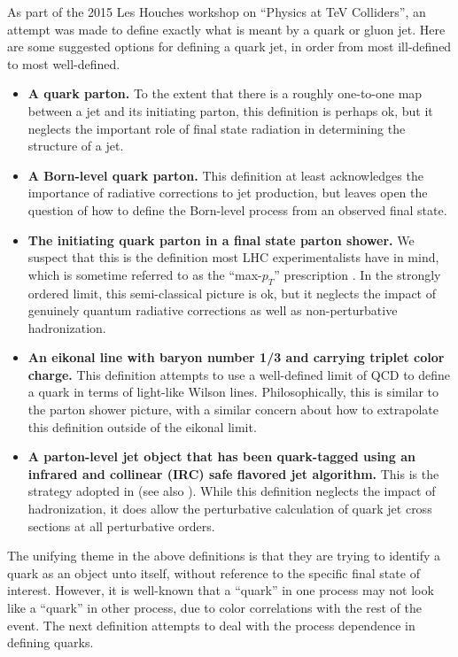 \documentclass[11pt,letterpaper]{article}
\begin{document}
As part of the 2015 Les Houches workshop on ``Physics at TeV Colliders'', an attempt was made to define exactly what is meant by a quark or gluon jet.  Here are some suggested options for defining a quark jet, in order from most ill-defined to most well-defined.
\begin{itemize}
\item \textbf{A quark parton.}  To the extent that there is a roughly one-to-one map between a jet and its initiating parton, this definition is perhaps ok, but it neglects the important role of final state radiation in determining the structure of a jet.
\item \textbf{A Born-level quark parton.}  This definition at least acknowledges the importance of radiative corrections to jet production, but leaves open the question of how to define the Born-level process from an observed final state. 
\item \textbf{The initiating quark parton in a final state parton shower.}  We suspect that this is the definition most LHC experimentalists have in mind, which is sometime referred to as the ``max-$p_T$'' prescription \cite{}.  In the strongly ordered limit, this semi-classical picture is ok, but it neglects the impact of genuinely quantum radiative corrections as well as non-perturbative hadronization. 
\item \textbf{An eikonal line with baryon number 1/3 and carrying triplet color charge.}  This definition attempts to use a well-defined limit of QCD to define a quark in terms of light-like Wilson lines.  Philosophically, this is similar to the parton shower picture, with a similar concern about how to extrapolate this definition outside of the eikonal limit.
\item \textbf{A parton-level jet object that has been quark-tagged using an infrared and collinear (IRC) safe flavored jet algorithm.}  This is the strategy adopted in \cite{} (see also \cite{}).  While this definition neglects the impact of hadronization, it does allow the perturbative calculation of quark jet cross sections at all perturbative orders.
\end{itemize}
The unifying theme in the above definitions is that they are trying to identify a quark as an object unto itself, without reference to the specific final state of interest.  However, it is well-known that a ``quark'' in one process may not look like a ``quark'' in other process, due to color correlations with the rest of the event.  The next definition attempts to deal with the process dependence in defining quarks. 
\end{document}
